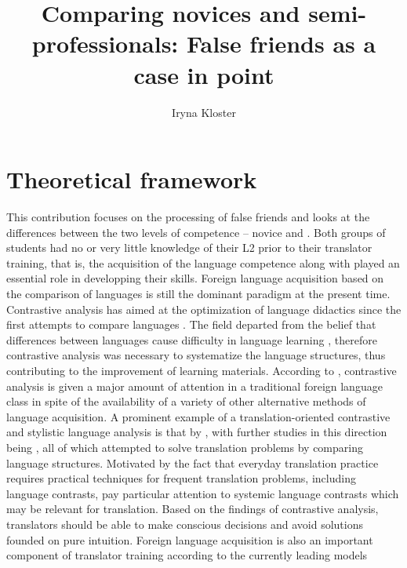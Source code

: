 \documentclass[output=paper]{langsci/langscibook.cls}
\title{Comparing novices and semi-pro\-fes\-sion\-als: False friends as a case in point}
\author{Iryna Kloster
\affiliation{FTSK Germersheim, Johannes-Gutenberg-Universtität Mainz}
}
\begin{document}
\maketitle


\section{Theoretical framework}

This contribution focuses on the processing of false friends and looks at the differences between the two levels of competence -- novice and . Both groups of students had no or very little knowledge of their L2 prior to their translator training, that is, the acquisition of the language competence along with  played an essential role in developping their skills.  Foreign language acquisition based on the comparison of languages is still the dominant paradigm at the present time.  Contrastive analysis has aimed at the optimization of language didactics since the first attempts to compare languages \citep{Lado1957, Alatis1968, Fisiak1981}. The field departed from the belief that differences between languages cause difficulty in language learning \citep[10]{Hawkins1986}, therefore contrastive analysis was necessary to systematize the language structures, thus contributing to the improvement of learning materials.  According to \citet{PruferLeske1997}, contrastive analysis is given a major amount of attention in a traditional foreign language class in spite of the availability of a variety of other alternative methods of language acquisition. A prominent example of a translation-oriented contrastive and stylistic language analysis is that by \citet{Vinay1977}, with further studies in this direction being \citep{Truffaut1963, Henschelmann1980, Gallagher1982}, all of which attempted to solve translation problems by comparing language structures. Motivated by the fact that everyday translation practice requires practical techniques for frequent translation problems, including language contrasts, \citet{Konigs2011} pay particular attention to systemic language contrasts which may be relevant for translation.  Based on the findings of contrastive analysis, translators should be able to make conscious decisions and avoid solutions founded on pure intuition. Foreign language acquisition is also an important component of translator training according to the currently leading  models \citep{PACTE2000, PACTE2003, Gopferich2008, Gopferich2009Towards}
\end{document}
